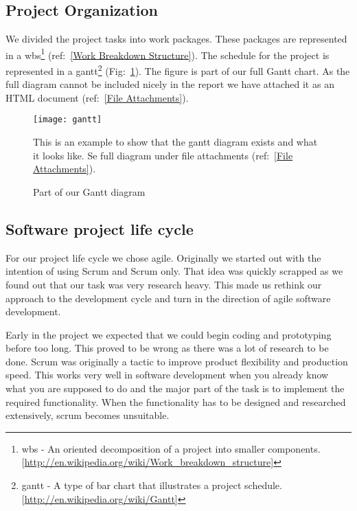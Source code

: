     \subsection{Project Organization}\label{Project Organization}
    
    We divided the project tasks into work packages. These packages are represented in a \gls{wbs}\footnote{\gls{wbs} - An oriented decomposition of a project into smaller components. [\url{http://en.wikipedia.org/wiki/Work_breakdown_structure}]} (ref:~\ref{Work Breakdown Structure}). The schedule for the project is represented in a \gls{gantt}\footnote{\gls{gantt} - A type of bar chart that illustrates a project schedule. [\url{http://en.wikipedia.org/wiki/Gantt}]} (Fig:~\ref{fig:gantt}). The figure is part of our full Gantt chart. As the full diagram cannot be included nicely in the report we have attached it as an HTML document (ref:~\ref{File Attachments}).
     
        \begin{figure}[h]
            \centering
            \texttt{[image: gantt]}
            \caption{Part of our Gantt diagram} 
            This is an example to show that the gantt diagram exists and what it looks like. Se full diagram under file attachments (ref:~\ref{File Attachments}).
            \label{fig:gantt}
        \end{figure}
    
    \subsection{Software project life cycle}\label{Software project life cycle}
    
    For our project life cycle we chose agile. Originally we started out with the intention of using Scrum and Scrum only. That idea was quickly scrapped as we found out that our task was very research heavy. This made us rethink our approach to the development cycle and turn in the direction of agile software development.
    
    Early in the project we expected that we could begin coding and prototyping before too long. This proved to be wrong as there was a lot of research to be done. Scrum was originally a tactic to improve product flexibility and production speed. This works very well in software development when you already know what you are supposed to do and the major part of the task is to implement the required functionality. When the functionality has to be designed and researched extensively, scrum becomes unsuitable. 
    
